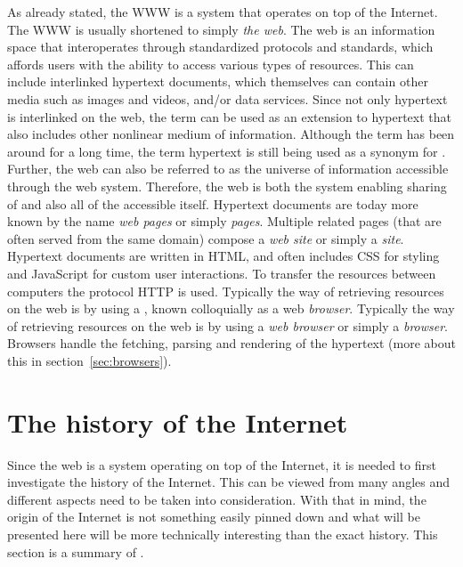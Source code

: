   As already stated, the \gls{WWW} is a system that operates on top of the Internet.
  The \gls{WWW} is usually shortened to simply \emph{the \gls{web}}.
  The \gls{web} is an information space that interoperates through standardized protocols and standards, which affords users with the ability to access various types of resources.
  This can include interlinked \gls{hypertext} \glspl{document}, which themselves can contain other media such as images and videos, and/or data services.
  Since not only \gls{hypertext} is interlinked on the \gls{web}, the term \emph{} can be used as an extension to \gls{hypertext} that also includes other nonlinear medium of information.
  Although the term  has been around for a long time, the term \gls{hypertext} is still being used as a synonym for .
  Further, the \gls{web} can also be referred to as the universe of information accessible through the \gls{web} system.
  Therefore, the \gls{web} is both the system enabling sharing of  and also all of the accessible  itself.
  Hypertext \glspl{document} are today more known by the name \emph{\gls{web} pages} or simply \emph{pages}.
  Multiple related pages (that are often served from the same domain) compose a \emph{web site} or simply a \emph{site}.
  Hypertext \glspl{document} are written in \gls{HTML}, and often includes \gls{CSS} for styling and \gls{JavaScript} for custom user interactions.
  To transfer the resources between computers the protocol \gls{HTTP} is used.
  Typically the way of retrieving resources on the web is by using a \emph{}, known colloquially as a \gls{web} \emph{\gls{browser}}.
  Typically the way of retrieving resources on the \gls{web} is by using a \emph{\gls{web} \gls{browser}} or simply a \emph{\gls{browser}}.
  Browsers handle the fetching, parsing and rendering of the \gls{hypertext} (more about this in section~\ref{sec:browsers}).
  
  \section{The history of the Internet}\label{sec:history-internet}
    \begin{metatext}
      Since the \gls{web} is a system operating on top of the Internet, it is needed to first investigate the history of the Internet.
      This can be viewed from many angles and different aspects need to be taken into consideration.
      With that in mind, the origin of the Internet is not something easily pinned down and what will be presented here will be more technically interesting than the exact history.
      This section is a summary of .
    \end{metatext}

